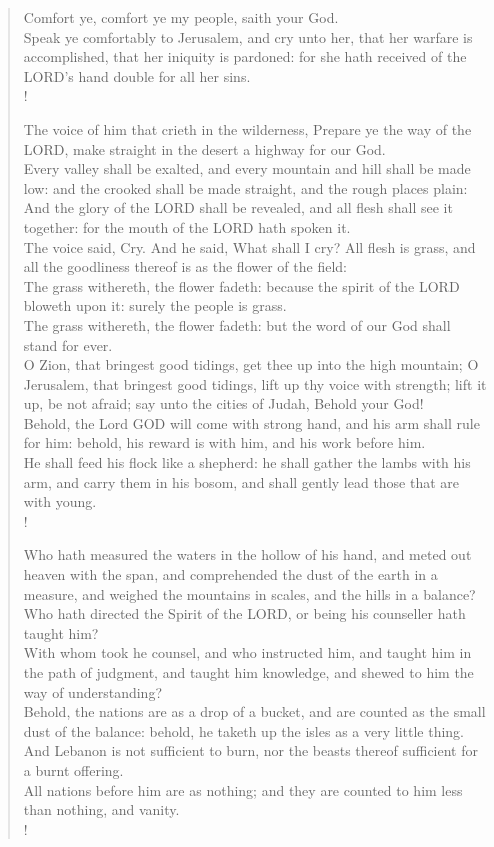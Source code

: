 \documentclass[MAIN]{subfiles}
\begin{document}
\begin{verse}
Comfort ye, comfort ye my people, saith your God.\\
Speak ye comfortably to {\sc Jerusalem}, and cry unto her, that her warfare is accomplished, that her iniquity is pardoned: for she hath received of the {\hge LORD}'s hand double for all her sins.\\!

The voice of him that crieth in the wilderness, Prepare ye the way of the {\hge LORD}, make straight in the desert a highway for our God.\\
Every valley shall be exalted, and every mountain and hill shall be made low: and the crooked shall be made straight, and the rough places plain:\\
And the glory of the {\hge LORD} shall be revealed, and all flesh shall see it together: for the mouth of the {\hge LORD} hath spoken it.\\
The voice said, Cry. And he said, What shall I cry? All flesh is grass, and all the goodliness thereof is as the flower of the field:\\
The grass withereth, the flower fadeth: because the spirit of the {\hge LORD} bloweth upon it: surely the people is grass.\\
The grass withereth, the flower fadeth: but the word of our God shall stand for ever.\\
O {\sc Zion}, that bringest good tidings, get thee up into the high mountain; O {\sc Jerusalem}, that bringest good tidings, lift up thy voice with strength; lift it up, be not afraid; say unto the cities of Judah, Behold your God!\\
Behold, the Lord {\hge GOD} will come with strong hand, and his arm shall rule for him: behold, his reward is with him, and his work before him.\\
He shall feed his flock like a shepherd: he shall gather the lambs with his arm, and carry them in his bosom, and shall gently lead those that are with young.\\!

Who hath measured the waters in the hollow of his hand, and meted out heaven with the span, and comprehended the dust of the earth in a measure, and weighed the mountains in scales, and the hills in a balance?\\
Who hath directed the Spirit of the {\hge LORD}, or being his counseller hath taught him?\\
With whom took he counsel, and who instructed him, and taught him in the path of judgment, and taught him knowledge, and shewed to him the way of understanding?\\
Behold, the nations are as a drop of a bucket, and are counted as the small dust of the balance: behold, he taketh up the isles as a very little thing.\\
And Lebanon is not sufficient to burn, nor the beasts thereof sufficient for a burnt offering.\\
All nations before him are as nothing; and they are counted to him less than nothing, and vanity.\\!


\end{verse}
\end{document}
